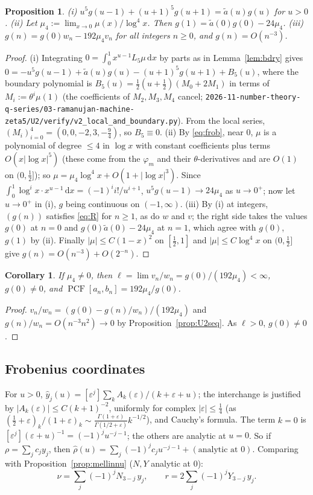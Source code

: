 \documentclass[11pt]{amsart}
\newtheorem{proposition}[theorem]{Proposition}
\newtheorem{corollary}[theorem]{Corollary}
\theoremstyle{definition}
\theoremstyle{remark}
\numberwithin{equation}{section}
\newcommand{\PCF}{\operatorname{PCF}}
\newcommand{\dd}{\,\mathrm{d}}
\newcommand{\at}{\tilde a}
\newcommand{\file}[1]{\nolinkurl{2026-11-number-theory-q-series/03-ramanujan-machine-zeta5/#1}}
\begin{document}
\begin{proposition}\label{prop:g}
\textup{(i)} $u^5g(u-1)+(u+1)^5g(u+1)=\at(u)g(u)$ for $u>0$.
\textup{(ii)} Let $\mu_4:=\lim_{x\to0}\mu(x)/\log^4x$. Then $g(1)=\at(0)g(0)-24\mu_4$.
\textup{(iii)} $g(n)=g(0)w_n-192\mu_4v_n$ for all integers $n\ge0$, and $g(n)=O(n^{-3})$.
\end{proposition}
\begin{proof}
(i) Integrating $0=\int_0^1x^{u-1}L_5\mu\dd x$ by parts as in Lemma~\ref{lem:bdry} gives $0=-u^5g(u-1)+\at(u)g(u)-(u+1)^5g(u+1)+B_5(u)$, where the boundary polynomial is $B_5(u)=\frac12(u+\frac12)(M_0+2M_1)$ in terms of $M_i:=\theta^i\mu(1)$ (the coefficients of $M_2,M_3,M_4$ cancel; \file{U2/verify/v2_local_and_boundary.py}). From the local series, $(M_i)_{i=0}^4=(0,0,-2,3,-\frac94)$, so $B_5\equiv0$.
(ii) By \eqref{eq:frob}, near $0$, $\mu$ is a polynomial of degree $\le4$ in $\log x$ with constant coefficients plus terms $O(x|\log x|^5)$ (these come from the $\varphi_m$ and their $\theta$-derivatives and are $O(1)$ on $(0,\frac12]$); so $\mu=\mu_4\log^4x+O(1+|\log x|^3)$. Since $\int_0^1\log^ix\cdot x^{u-1}\dd x=(-1)^ii!/u^{i+1}$, $u^5g(u-1)\to24\mu_4$ as $u\to0^+$; now let $u\to0^+$ in (i), $g$ being continuous on $(-1,\infty)$.
(iii) By (i) at integers, $(g(n))$ satisfies \eqref{eq:R} for $n\ge1$, as do $w$ and $v$; the right side takes the values $g(0)$ at $n=0$ and $g(0)\at(0)-24\mu_4$ at $n=1$, which agree with $g(0)$, $g(1)$ by (ii). Finally $|\mu|\le C(1-x)^2$ on $[\frac12,1]$ and $|\mu|\le C\log^4x$ on $(0,\frac12]$ give $g(n)=O(n^{-3})+O(2^{-n})$.
\end{proof}

\begin{corollary}\label{cor:minimal}
If $\mu_4\neq0$, then $\ell=\lim v_n/w_n=g(0)/(192\mu_4)<\infty$, $g(0)\neq0$, and $\PCF[a_n,b_n]=192\mu_4/g(0)$.
\end{corollary}
\begin{proof}
$v_n/w_n=(g(0)-g(n)/w_n)/(192\mu_4)$ and $g(n)/w_n=O(n^{-3}n^2)\to0$ by Proposition~\ref{prop:U2seq}. As $\ell>0$, $g(0)\neq0$.
\end{proof}

\subsection{Frobenius coordinates}
For $u>0$, $\hat y_j(u)=[\varepsilon^j]\sum_kA_k(\varepsilon)/(k+\varepsilon+u)$; the interchange is justified by $|A_k(\varepsilon)|\le C(k+1)^{-2}$, uniformly for complex $|\varepsilon|\le\frac14$ (as $(\frac12+\varepsilon)_k/(1+\varepsilon)_k\sim\frac{\Gamma(1+\varepsilon)}{\Gamma(1/2+\varepsilon)}k^{-1/2}$), and Cauchy's formula. The term $k=0$ is $[\varepsilon^j](\varepsilon+u)^{-1}=(-1)^ju^{-j-1}$; the others are analytic at $u=0$. So if $\rho=\sum_jc_jy_j$, then $\hat\rho(u)=\sum_j(-1)^jc_ju^{-j-1}+(\text{analytic at }0)$. Comparing with Proposition~\ref{prop:mellinnu} ($N,Y$ analytic at $0$):
\begin{equation}\label{eq:coords}
\nu=\sum_j(-1)^jN_{3-j}\,y_j,\qquad r=2\sum_j(-1)^jY_{3-j}\,y_j.
\end{equation}
\end{document}
